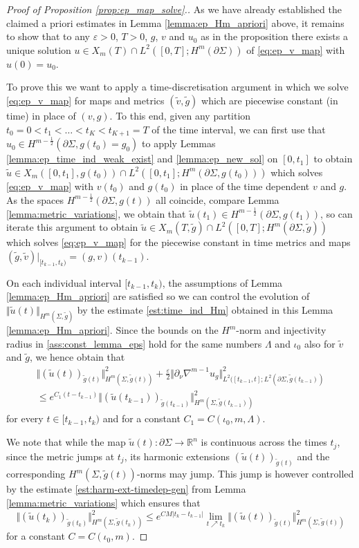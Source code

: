\documentclass[10pt,reqno]{amsart}
\theoremstyle{plain}
\theoremstyle{definition}
\numberwithin{equation}{section}
\newcommand{\La}{\Lambda}
\newcommand{\Si}{\Sigma}
\newcommand{\R}{\ensuremath{{\mathbb R}}}
\newcommand{\norm}[1]{\Vert#1\Vert}
\newcommand{\beqa}{\begin{equation}\begin{aligned}}
\newcommand{\eeqa}{\end{aligned}\end{equation}}
\newcommand{\half}{\frac{1}{2}}
\newcommand{\abs}[1]{\vert#1\vert}
\newcommand{\eps}{\varepsilon}
\newcommand{\pSi}{{\partial \Sigma}}
\newcommand{\p}{\partial} %
\begin{document}
\begin{proof}[Proof of Proposition \ref{prop:ep_map_solve}.]
    As we have already established the claimed a priori estimates in Lemma \ref{lemma:ep_Hm_apriori} above, it remains to show that to any $\eps>0$, $T>0$, $g$, $v$ and $u_0$ as in the proposition there exists a unique solution $u\in X_m(T)\cap L^2([0,T];H^{m}(\pSi)) $ of \eqref{eq:ep_v_map} with $u(0) = u_0$.

    To prove this we want to apply a time-discretisation argument in which we solve \eqref{eq:ep_v_map} for maps and metrics $(\tilde v,\tilde g)$ which are piecewise constant (in time) in place of $(v,g)$. To this end, given any partition  $t_0=0<t_1<\ldots<t_K<t_{K+1}=T$ of the time interval, we can first use that $u_0\in H^{m-\half}(\pSi,g(t_0)=g_0)$ to apply Lemmas \ref{lemma:ep_time_ind_weak_exist} and \ref{lemma:ep_new_sol} on $[0,t_1]$ to obtain $\tilde u\in X_{m}([0,t_1],g(t_0)) \cap L^2([0,t_1];H^{m}(\pSi,g(t_0)))$ which solves \eqref{eq:ep_v_map} with $v(t_0)$ and $g(t_0)$ in place of the time dependent $v$ and $g$. As the spaces $H^{m-\half}(\pSi,g(t))$ all coincide, compare Lemma \ref{lemma:metric_variations}, we obtain that $\tilde u(t_1)\in H^{m-\half}(\pSi,g(t_1))$, so can iterate this argument to obtain $\tilde u\in X_{m}(T,\tilde g) \cap L^2([0,T];H^{m}(\pSi,\tilde g))$ which solves \eqref{eq:ep_v_map} for the piecewise constant in time metrics and maps $(\tilde g,\tilde v)\vert_{[t_{k-1},t_k)}=(g,v)(t_{k-1})$. 

    On each individual interval $[t_{k-1},t_k)$, the assumptions of Lemma \ref{lemma:ep_Hm_apriori} are satisfied so we can control the evolution of $\norm{\tilde u(t)}_{H^{m}(\Si,\tilde g)}$ by the estimate \eqref{est:time_ind_Hm} obtained in this Lemma \ref{lemma:ep_Hm_apriori}. Since the bounds on the $H^m$-norm and injectivity radius in \eqref{ass:const_lemma_eps} hold for the same numbers $\La$ and $\iota_0$ also for $\tilde v$ and $\tilde g$, we hence obtain that 
    \beqa\label{est:pv_const_apriori0}
        \norm{(\tilde u(t))_{\tilde g(t)}}_{H^m(\Si,\tilde g(t))}^2 +\tfrac{\eps}{2} \norm{\p_\nu \nabla^{m-1} u_g}_{L^2([t_{k-1},t]; L^2(\p\Si,\tilde{g}(t_{k-1}))}^2\\
        \le e^{C_1(t-t_{k-1})}\norm{(\tilde u(t_{k-1}))_{\tilde g(t_{k-1})}}_{H^m(\Si, \tilde g(t_{k-1}))}^2
    \eeqa
    for every $t\in [t_{k-1},t_k)$ and for a constant $C_1=C(\iota_0,m,\La)$. 
    
    We note that while the map $\tilde u(t):\p\Si\to \R^n$ is continuous across the times $t_j$, since the metric jumps at $t_j$, its harmonic extensions $(\tilde u(t))_{\tilde g(t)}$ and the corresponding $H^m(\Si,\tilde g(t))$-norms may jump. This jump is however controlled by the estimate \eqref{est:harm-ext-timedep-gen} from Lemma \ref{lemma:metric_variations} which ensures that 
    \begin{equation}\label{est:norm_jump} 
      \norm{(\tilde u(t_k))_{\tilde g(t_{k})}}_{H^m(\Si,\tilde g(t_k))}^2 \le e^{C M\abs{t_k-t_{k-1}}}\lim_{t \nearrow t_{k}}\norm{(\tilde u(t))_{\tilde g(t)}}_{H^m(\Si,\tilde g(t))}^2
    \end{equation} 
    for a constant $C=C(\iota_0,m)$.   
    

\end{proof}
\end{document}
